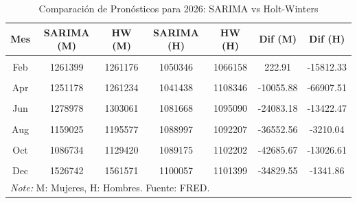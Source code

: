 \documentclass[
  11pt,
  letterpaper,
  DIV=11,
  numbers=noendperiod]{scrartcl}
\begin{document}
\begin{longtable}[t]{ccccccc}
\caption{\label{tab:unnamed-chunk-18}Comparación de Pronósticos para 2026: SARIMA vs Holt-Winters}\\
\toprule
Mes & SARIMA (M) & HW (M) & SARIMA (H) & HW (H) & Dif (M) & Dif (H)\\
\midrule
\cellcolor{gray!10}{Jan} & \cellcolor{gray!10}{1424123} & \cellcolor{gray!10}{1431665} & \cellcolor{gray!10}{1048420} & \cellcolor{gray!10}{1058730} & \cellcolor{gray!10}{-7542.50} & \cellcolor{gray!10}{-10310.16}\\
Feb & 1261399 & 1261176 & 1050346 & 1066158 & 222.91 & -15812.33\\
\cellcolor{gray!10}{Mar} & \cellcolor{gray!10}{1252980} & \cellcolor{gray!10}{1265204} & \cellcolor{gray!10}{1046617} & \cellcolor{gray!10}{1104777} & \cellcolor{gray!10}{-12223.97} & \cellcolor{gray!10}{-58159.71}\\
Apr & 1251178 & 1261234 & 1041438 & 1108346 & -10055.88 & -66907.51\\
\cellcolor{gray!10}{May} & \cellcolor{gray!10}{1223038} & \cellcolor{gray!10}{1245016} & \cellcolor{gray!10}{1039159} & \cellcolor{gray!10}{1108497} & \cellcolor{gray!10}{-21978.14} & \cellcolor{gray!10}{-69337.55}\\
\addlinespace
Jun & 1278978 & 1303061 & 1081668 & 1095090 & -24083.18 & -13422.47\\
\cellcolor{gray!10}{Jul} & \cellcolor{gray!10}{1206043} & \cellcolor{gray!10}{1231563} & \cellcolor{gray!10}{1059958} & \cellcolor{gray!10}{1092388} & \cellcolor{gray!10}{-25520.24} & \cellcolor{gray!10}{-32429.96}\\
Aug & 1159025 & 1195577 & 1088997 & 1092207 & -36552.56 & -3210.04\\
\cellcolor{gray!10}{Sep} & \cellcolor{gray!10}{1150232} & \cellcolor{gray!10}{1175402} & \cellcolor{gray!10}{1063291} & \cellcolor{gray!10}{1098017} & \cellcolor{gray!10}{-25170.41} & \cellcolor{gray!10}{-34725.97}\\
Oct & 1086734 & 1129420 & 1089175 & 1102202 & -42685.67 & -13026.61\\
\addlinespace
\cellcolor{gray!10}{Nov} & \cellcolor{gray!10}{1174631} & \cellcolor{gray!10}{1215670} & \cellcolor{gray!10}{1081721} & \cellcolor{gray!10}{1102613} & \cellcolor{gray!10}{-41039.09} & \cellcolor{gray!10}{-20892.01}\\
Dec & 1526742 & 1561571 & 1100057 & 1101399 & -34829.55 & -1341.86\\
\bottomrule
\multicolumn{7}{l}{\rule{0pt}{1em}\textit{Note: } M: Mujeres, H: Hombres. Fuente: FRED.}\\
\end{longtable}
\end{document}
